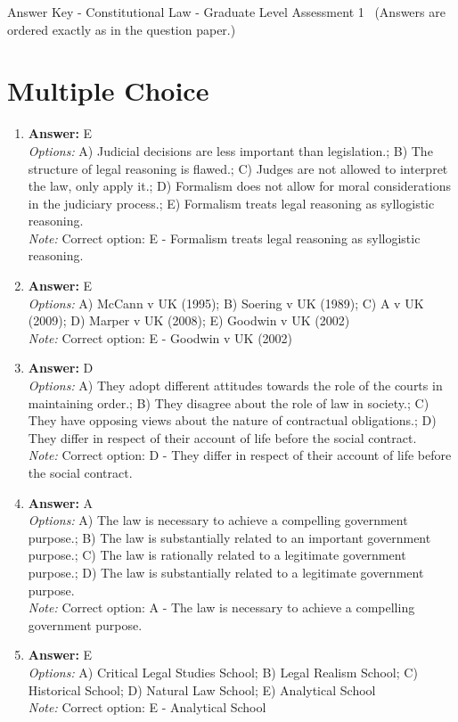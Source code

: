 \documentclass[12pt]{article}
\begin{document}
\begin{center}
Answer Key - Constitutional Law - Graduate Level Assessment 1 \
\small (Answers are ordered exactly as in the question paper.)
\end{center}

\section*{Multiple Choice}
\begin{enumerate}[label=\arabic*.]
\item \textbf{Answer:} E
\\ \textit{Options:} A) Judicial decisions are less important than legislation.; B) The structure of legal reasoning is flawed.; C) Judges are not allowed to interpret the law, only apply it.; D) Formalism does not allow for moral considerations in the judiciary process.; E) Formalism treats legal reasoning as syllogistic reasoning.
\\ \textit{Note:} Correct option: E - Formalism treats legal reasoning as syllogistic reasoning.
\item \textbf{Answer:} E
\\ \textit{Options:} A) McCann v UK (1995); B) Soering v UK (1989); C) A v UK (2009); D) Marper v UK (2008); E) Goodwin v UK (2002)
\\ \textit{Note:} Correct option: E - Goodwin v UK (2002)
\item \textbf{Answer:} D
\\ \textit{Options:} A) They adopt different attitudes towards the role of the courts in maintaining order.; B) They disagree about the role of law in society.; C) They have opposing views about the nature of contractual obligations.; D) They differ in respect of their account of life before the social contract.
\\ \textit{Note:} Correct option: D - They differ in respect of their account of life before the social contract.
\item \textbf{Answer:} A
\\ \textit{Options:} A) The law is necessary to achieve a compelling government purpose.; B) The law is substantially related to an important government purpose.; C) The law is rationally related to a legitimate government purpose.; D) The law is substantially related to a legitimate government purpose.
\\ \textit{Note:} Correct option: A - The law is necessary to achieve a compelling government purpose.
\item \textbf{Answer:} E
\\ \textit{Options:} A) Critical Legal Studies School; B) Legal Realism School; C) Historical School; D) Natural Law School; E) Analytical School
\\ \textit{Note:} Correct option: E - Analytical School
\end{enumerate}
\end{document}
